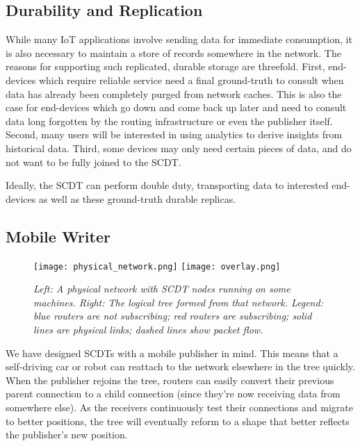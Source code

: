 \subsection{Durability and Replication}
\label{durability-replication}

While many IoT applications involve sending data for immediate consumption, it is also necessary to maintain a store of records somewhere in the network.  The reasons for supporting such replicated, durable storage are threefold.  First, end-devices which require reliable service need a final ground-truth to consult when data has already been completely purged from network caches.  This is also the case for end-devices which go down and come back up later and need to consult data long forgotten by the routing infrastructure or even the publisher itself.  Second, many users will be interested in using analytics to derive insights from historical data.  Third, some devices may only need certain pieces of data, and do not want to be fully joined to the SCDT.

Ideally, the SCDT can perform double duty, transporting data to interested end-devices as well as these ground-truth durable replicas.

\subsection{Mobile Writer}
\label{mobile-writer}
\begin{figure}[t]
	\begin{center}
		\texttt{[image: physical\_network.png]}
		\texttt{[image: overlay.png]}
	\end{center}
	\vspace{-1.3em}
	\caption{\small \itshape Left: A physical network with SCDT nodes running on some machines.  Right: The logical tree formed from that network.  Legend: blue routers are not subscribing; red routers are subscribing; solid lines are physical links; dashed lines show packet flow.}
	\vspace{-1em}
	\label{fig:multicast-tree}
\end{figure}
We have designed SCDTs with a mobile publisher in mind. This means that a self-driving car or robot can reattach to the network elsewhere in the tree quickly. When the publisher rejoins the tree, routers can easily convert their previous parent connection to a child connection (since they're now receiving data from somewhere else). As the receivers continuously test their connections and migrate to better positions, the tree will eventually reform to a shape that better reflects the publisher's new position.

